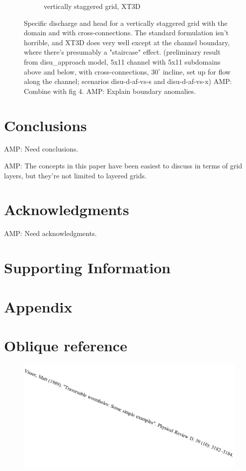 \documentclass{article}
\begin{document}
\begin{figure}[H]
\begin{subfigure}{0.4\textwidth}
	\caption{vertically staggered grid, XT3D}
	\label{fig:disu-x-cc-head}
\end{subfigure}
\caption{Specific discharge and head for a vertically staggered grid with the domain and with cross-connections. The standard formulation isn't horrible, and XT3D does very well except at the channel boundary, where there's presumably a "staircase" effect. (preliminary result from disu\_approach model, 5x11 channel with 5x11 subdomains above and below, with cross-connections, $30^{\circ}$ incline, set up for flow along the channel; scenarios disu-d-af-vs-s and disu-d-af-vs-x) {\color{red} AMP: Combine with fig 4.} {\color{red} AMP: Explain boundary anomalies.}}
\label{fig:figures}
\end{figure}

\section{Conclusions}

{\color{red} AMP: Need conclusions.}

{\color{red} AMP: The concepts in this paper have been easiest to discuss in terms of grid layers, but they're not limited to layered grids.}

\section{Acknowledgments}
{\color{red} AMP: Need acknowledgments.}

\section{Supporting Information}

\section{Appendix}



\section{Oblique reference}

\begin{figure}[H]
	\includegraphics[scale=0.5]{../figures/oblique_reference.png}
\end{figure}
\end{document}
